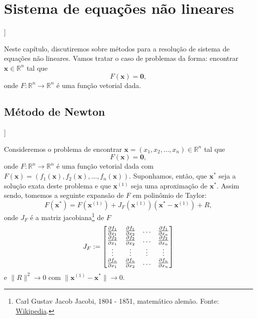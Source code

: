 
\chapter{Sistema de equações não lineares}\label{cap_snl}
\thispagestyle{fancy}

\begin{flushleft}
  [[tag:revisar]]
\end{flushleft}

Neste capítulo, discutiremos sobre métodos para a resolução de sistema de equações não lineares. Vamos tratar o caso de problemas da forma: encontrar $\pmb{x}\in\mathbb{R}^n$ tal que
\begin{equation}
  F(\pmb{x}) = \pmb{0},
\end{equation}
onde $F:\mathbb{R}^n\to\mathbb{R}^n$ é uma função vetorial dada.

\section{Método de Newton}\label{cap_snl_sec_newton}

\begin{flushleft}
  [[tag:revisar]]
\end{flushleft}

Consideremos o problema de encontrar $\pmb{x} = (x_1, x_2, \dotsc, x_n)\in\mathbb{R}^n$ tal que
\begin{equation}
  F(\pmb{x}) = \pmb{0},
\end{equation}
onde $F:\mathbb{R}^n\to\mathbb{R}^n$ é uma função vetorial dada com $F(\pmb{x}) = (f_1(\pmb{x}), f_2(\pmb{x}), \dotsc, f_n(\pmb{x}))$. Suponhamos, então, que $\pmb{x}^*$ seja a solução exata deste problema e que $\pmb{x}^{(1)}$ seja uma aproximação de $\pmb{x}^*$. Assim sendo, tomemos a seguinte expansão de $F$ em polinômio de Taylor:
\begin{equation}
  F(\pmb{x}^*) = F(\pmb{x}^{(1)}) + J_F(\pmb{x}^{(1)})(\pmb{x}^*-\pmb{x}^{(1)}) + R,
\end{equation}
onde $J_F$ é a matriz jacobiana\footnote{Carl Gustav Jacob Jacobi, 1804 - 1851, matemático alemão. Fonte: \href{https://en.wikipedia.org/wiki/Carl_Gustav_Jacob_Jacobi}{Wikipedia}.} de $F$
\begin{equation}
  J_F :=
  \begin{bmatrix}
    \frac{\partial f_1}{\partial x_1} & \frac{\partial f_1}{\partial x_2} & \ldots & \frac{\partial f_1}{\partial x_n}\\
    \frac{\partial f_2}{\partial x_1} & \frac{\partial f_2}{\partial x_2} & \ldots & \frac{\partial f_2}{\partial x_n}\\
    \vdots & \vdots & \vdots & \vdots \\
    \frac{\partial f_n}{\partial x_1} & \frac{\partial f_n}{\partial x_2} & \ldots & \frac{\partial f_n}{\partial x_n}\\
  \end{bmatrix}
\end{equation}
e $\|R\|^2\to 0$ com $\|\pmb{x}^{(1)}-\pmb{x}^*\|\to 0$. 

